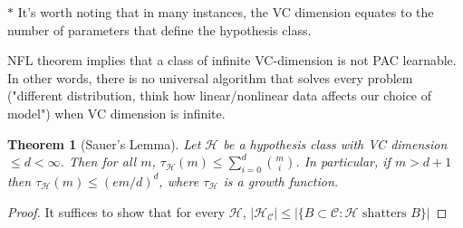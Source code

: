 \documentclass{article}
\newtheorem{theorem}{Theorem}
\theoremstyle{remark}
\begin{document}
     $\ast$ It's worth noting that in many instances, the VC dimension equates to the number of parameters that define the hypothesis class.

     NFL theorem implies that a class of infinite VC-dimension is not PAC learnable. In other words, there is no universal algorithm 
     that solves every problem ("different distribution, think how linear/nonlinear data affects our choice of model") when VC dimension is infinite.

     \begin{theorem}[Sauer's Lemma]
     Let $\mathcal{H}$ be a hypothesis class with VC dimension $\leq d<\infty$. Then for all $m$, $\tau_\mathcal{H}(m)\leq\sum^d_{i=0}\binom{m}i$. In particular, if $m>d+1$ then $\tau_\mathcal{H}(m)\leq (em/d)^d$, where $\tau_\mathcal{H}$ is a growth function.
     \end{theorem}
     \begin{proof}
     It suffices to show that for every $\mathcal{H}$, $\lvert \mathcal{H}_\mathcal{C}\rvert\leq\vert\{B\subset \mathcal{C}:\mathcal{H}\text{ shatters }B\}\vert$
     \end{proof}
\end{document}
